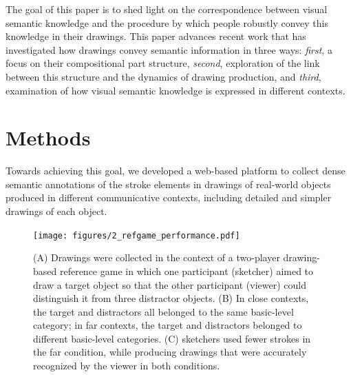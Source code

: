 \documentclass[10pt,letterpaper]{article}
\begin{document}

The goal of this paper is to shed light on the correspondence between visual semantic knowledge and the procedure by which people robustly convey this knowledge in their drawings.
This paper advances recent work \cite{FanCommon2018} that has investigated how drawings convey semantic information in three ways: 
\textit{first}, a focus on their compositional part structure,
\textit{second}, exploration of the link between this structure and the dynamics of drawing production,
and \textit{third}, examination of how visual semantic knowledge is expressed in different contexts. 


\section{Methods}

Towards achieving this goal, we developed a web-based platform to collect dense semantic annotations of the stroke elements in drawings of real-world objects produced in different communicative contexts, including detailed and simpler drawings of each object. 

\begin{figure}[htbp]
\centering
\texttt{[image: figures/2\_refgame\_performance.pdf]}
\caption{(A) Drawings were collected in the context of a two-player drawing-based reference game in which one participant (sketcher) aimed to draw a target object so that the other participant (viewer) could distinguish it from three distractor objects. (B) In close contexts, the target and distractors all belonged to the same basic-level category; in far contexts, the target and distractors belonged to different basic-level categories. (C) sketchers used fewer strokes in the far condition, while producing drawings that were accurately recognized by the viewer in both conditions.}
\label{refgame_performance}
\end{figure}
\end{document}
